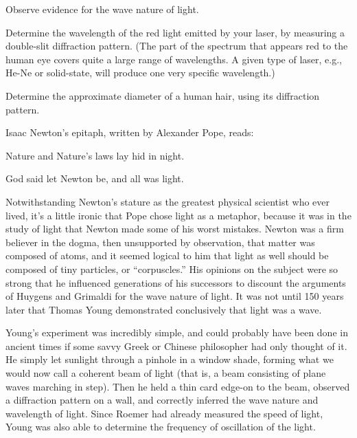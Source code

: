 \label{lab:wave-optics}

\apparatus
{}

\begin{goals}


\item[] Observe evidence for the wave nature of light.

\item[] Determine the wavelength of the red light emitted by your laser, by measuring a double-slit
diffraction pattern. (The part of the spectrum that appears red to the human eye covers quite a large
range of wavelengths. A given type of laser, e.g., He-Ne or solid-state, will produce one very specific
wavelength.)

\item[] Determine the approximate diameter of a human hair, using
its diffraction pattern.
\end{goals}

\label{fig:fringes}

\introduction

Isaac Newton's epitaph, written by Alexander Pope, reads:

   Nature and Nature's laws lay hid in night.

   God said let Newton be, and all was light.

Notwithstanding Newton's stature as the greatest physical
scientist who ever lived, it's a little ironic that Pope
chose light as a metaphor, because it was in the study of
light that Newton made some of his worst mistakes. Newton
was a firm believer in the dogma, then unsupported by
observation, that matter was composed of atoms, and it
seemed logical to him that light as well should be composed
of tiny particles, or ``corpuscles.'' His opinions on the
subject were so strong that he influenced generations of his
successors to discount the arguments of Huygens and Grimaldi
for the wave nature of light. It was not until 150 years
later that Thomas Young demonstrated conclusively that light was a wave.

Young's experiment was incredibly simple, and could probably
have been done in ancient times if some savvy Greek or
Chinese philosopher had only thought of it. He simply let
sunlight through a pinhole in a window shade, forming what
we would now call a coherent beam of light (that is, a beam
consisting of plane waves marching in step). Then he held a
thin card edge-on to the beam, observed a diffraction
pattern on a wall, and correctly inferred the wave nature
and wavelength of light. Since Roemer had already measured
the speed of light, Young was also able to determine the
frequency of oscillation of the light.

